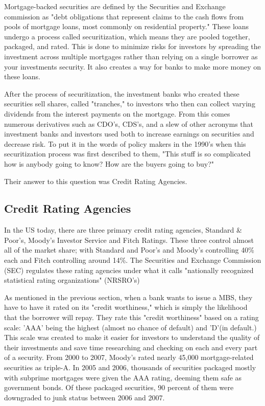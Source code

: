 \documentclass[11pt]{article}
\begin{document}
\begin{multicols}{2}
Mortgage-backed securities are defined by the Securities and Exchange commission as "debt obligations that represent claims to the cash flows from pools of mortgage loans, most commonly on residential property." \cite{secMBS} These loans undergo a process called securitization, which means they are pooled together, packaged, and rated.  This is done to minimize risks for investors by spreading the investment across multiple mortgages rather than relying on a single borrower as your investments security.  It also creates a way for banks to make more money on these loans.  


After the process of securitization, the investment banks who created these securities sell shares, called "tranches," to investors who then can collect varying dividends from the interest payments on the mortgage.  From this comes numerous derivatives such as CDO's, CDS's, and a slew of other acronyms that investment banks and investors used both to increase earnings on securities and decrease risk.  To put it in the words of policy makers in the 1990's when this securitization process was first described to them, "This stuff is so complicated how is anybody going to know? How are the buyers going to buy?" \cite[p.~68]{govtReport}  


Their answer to this question was Credit Rating Agencies.

\subsection{Credit Rating Agencies}
In the US today, there are three primary credit rating agencies, Standard \& Poor's, Moody's Investor Service and Fitch Ratings.  These three control almost all of the market share; with Standard and Poor's and Moody's controlling 40\% each and Fitch controlling around 14\%. \cite{wpMoodies}  The Securities and Exchange Commission (SEC) regulates these rating agencies under what it calls "nationally recognized statistical rating organizations" (NRSRO's) \cite{CivilLiability} 

As mentioned in the previous section, when a bank wants to issue a MBS, they have to have it rated on its "credit worthiness," which is simply the likelihood that the borrower will repay.  They rate this "credit worthiness" based on a rating scale: 'AAA' being the highest (almost no chance of default) and 'D'(in default.)  \cite{CivilLiability}  This scale was created to make it easier for investors to understand the quality of their investments and save time researching and checking on each and every part of a security.   From 2000 to 2007, Moody's rated nearly 45,000 mortgage-related securities as triple-A. \cite[p.~xxv]{govtReport} In 2005 and 2006, thousands of securities packaged mostly with subprime mortgages were given the AAA rating, deeming them safe as government bonds.  Of these packaged securities, 90 percent of them were downgraded to junk status between 2006 and 2007. \cite{ratingEthics}  


\end{multicols}
\end{document}
